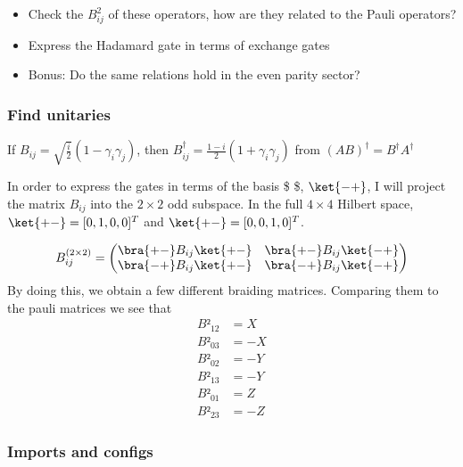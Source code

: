 \documentclass[11pt,landscape]{article}
\providecommand{\tightlist}{%
      \setlength{\itemsep}{0pt}\setlength{\parskip}{0pt}}
\begin{document}
\begin{itemize}
\tightlist
\item
  Check the \(B_{ij}^{2}\) of these operators, how are they related to
  the Pauli operators?
\item
  Express the Hadamard gate in terms of exchange gates
\item
  Bonus: Do the same relations hold in the even parity sector?
\end{itemize}

    \subsubsection{Find unitaries}\label{find-unitaries}

If \(\displaystyle  B_{ij} = \sqrt{\frac{i}{2}} (1-γ_iγ_j)\), then
\(\displaystyle  B_{ij}^{†} = \frac{1-i}{2} (1+γ_iγ_j)\) from
\((AB)^{†} = B^{†}A^{†}\)

In order to express the gates in terms of the basis \$\ket{+ - } \$,
\(\ket{-+}\), I will project the matrix \(B_{ij}\) into the \(2× 2\) odd
subspace. In the full \(4× 4\) Hilbert space, \(\ket{+-} = [0,1,0,0]^T\)
and \(\ket{+-} = [0,0,1,0]^T\).

\[
B_{ij}^{(2\times 2)} = 
\begin{pmatrix}
  \bra{+ - } B_{ij} \ket{+-} & \bra{+ - } B_{ij} \ket{-+}\\
  \bra{- + } B_{ij} \ket{+-} & \bra{- + } B_{ij} \ket{-+}
\end{pmatrix}
\] By doing this, we obtain a few different braiding matrices. Comparing
them to the pauli matrices we see that \[
\begin{aligned}
B²_{12} &= X\\
B²_{03} &= -X\\
B²_{02} &= -Y\\
B²_{13} &= -Y\\
B²_{01} &= Z\\
B²_{23} &= -Z
\end{aligned}
\]

    \subsubsection{Imports and configs}\label{imports-and-configs}
\end{document}
